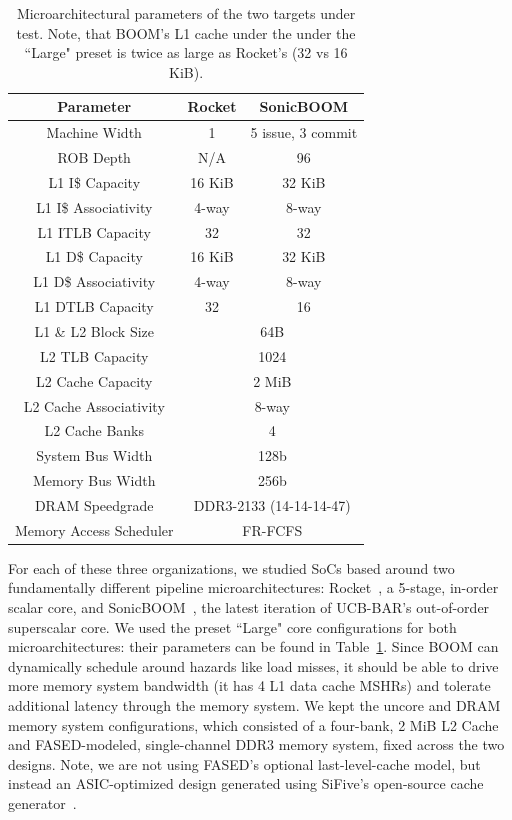 \begin{table}[t]
\centering
    \begin{tabular}{c c c}
    \hline
        \textbf{Parameter} & \textbf{Rocket} & \textbf{SonicBOOM} \\
    \hline
        Machine Width & 1 & 5 issue, 3 commit\\
        ROB Depth & N/A & 96 \\
        L1 I\$ Capacity & 16 KiB & 32 KiB \\
        L1 I\$ Associativity & 4-way & 8-way \\
        L1 ITLB Capacity & 32 & 32 \\
        L1 D\$ Capacity & 16 KiB & 32 KiB \\
        L1 D\$ Associativity & 4-way & 8-way \\
        L1 DTLB Capacity & 32 & 16 \\
        L1 \& L2 Block Size & \multicolumn{2}{c}{64B} \\
        L2 TLB Capacity &  \multicolumn{2}{c}{1024} \\
        L2 Cache Capacity & \multicolumn{2}{c}{2 MiB}\\
        L2 Cache Associativity & \multicolumn{2}{c}{8-way}\\
        L2 Cache Banks & \multicolumn{2}{c}{4}\\
        System Bus Width & \multicolumn{2}{c}{128b}\\
        Memory Bus Width & \multicolumn{2}{c}{256b}\\
        DRAM Speedgrade & \multicolumn{2}{c}{DDR3-2133 (14-14-14-47)} \\
        Memory Access Scheduler & \multicolumn{2}{c}{FR-FCFS} \\
    \end{tabular}
    \caption{Microarchitectural parameters of the two targets under test. Note, that BOOM's L1 cache under the
    under the ``Large" preset is twice as large as Rocket's (32 vs 16 KiB).}
    \label{tbl:core-parameters}
\end{table}


For each of these three organizations, we studied SoCs based around two
fundamentally different pipeline microarchitectures: Rocket~\cite{RocketChip},
a 5-stage, in-order scalar core, and SonicBOOM~\cite{SonicBOOM}, the latest iteration of UCB-BAR's out-of-order
superscalar core. We used the preset ``Large" core configurations for
both microarchitectures: their parameters can be found in
Table~\ref{tbl:core-parameters}. Since BOOM can dynamically schedule around
hazards like load misses, it should be able to drive more
memory system bandwidth (it has 4 L1 data cache MSHRs) and tolerate additional
latency through the memory system. We kept the
uncore and DRAM memory system configurations, which consisted of a four-bank, 2
MiB L2 Cache and FASED-modeled, single-channel DDR3 memory system, fixed across
the two designs. Note, we are not using FASED's optional last-level-cache model,
but instead an ASIC-optimized design generated using SiFive's open-source cache generator~\cite{SiFiveCache}.

